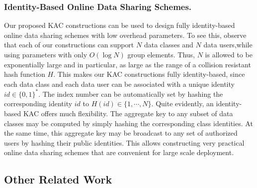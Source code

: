 \subsubsection{Identity-Based Online Data Sharing Schemes.} Our proposed KAC constructions can be used to design fully identity-based online data sharing schemes with low overhead parameters. To see this, observe that each of our constructions can support $N$ data classes and $N$ data users,while using parameters with only $O(\log N)$ group elements. Thus, $N$ is allowed to be exponentially large and in particular, as large as the range of a collision resistant hash function $H$. This makes our KAC constructions fully identity-based, since each data class and each data user can be associated with a unique identity $id\in\{0,1\}^{*}$. The index number can be automatically set by hashing the corresponding identity $id$ to $H(id)\in \{1,\cdots,N\}$. Quite evidently, an identity-based KAC offers much flexibility. The aggregate key to any subset of data classes may be computed by simply hashing the corresponding class identities. At the same time, this aggregate key may be broadcast to any set of authorized users by hashing their public identities. This allows constructing very practical online data sharing schemes that are convenient for large scale deployment.


\subsection{Other Related Work}
\label{subsec:relwork}

